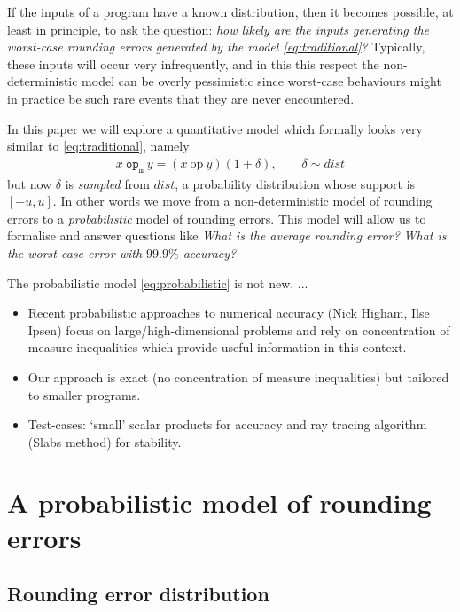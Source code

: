\documentclass[10pt,conference]{IEEEtran}
\newcommand{\mop}{\mathtt{op_m}}
\newcommand{\iop}{\mathrm{op}}
\begin{document}
If the inputs of a program have a known distribution, then it becomes possible, at least in principle, to ask the question: \textit{how likely are the inputs generating the worst-case rounding errors generated by the model \cref{eq:traditional}?} Typically, these inputs will occur very infrequently, and in this this respect the non-deterministic model can be overly pessimistic since worst-case behaviours might in practice be such rare events that they are never encountered. 

In this paper we will explore a quantitative model which formally looks very similar to \cref{eq:traditional}, namely
\begin{align}
x~\mop~y=(x~\iop~y)(1+\delta), \qquad\delta\sim dist \label{eq:probabilistic}
\end{align}
but now $\delta$ is \emph{sampled} from $dist$, a probability distribution whose support is $\left[-u,u\right]$. In other words we move from a non-deterministic model of rounding errors to a \emph{probabilistic} model of rounding errors. This model will allow us to formalise and answer questions like \textit{What is the average rounding error?} \textit{What is the worst-case error with $99.9\%$ accuracy?}

The probabilistic model \cref{eq:probabilistic} is not new. ...



\begin{itemize}
\item Recent probabilistic approaches to numerical accuracy (Nick Higham, Ilse Ipsen) focus on large/high-dimensional problems and rely on concentration of measure inequalities which provide useful information in this context.
\item Our approach is exact (no concentration of measure inequalities) but tailored to smaller programs. 
\item Test-cases: `small' scalar products for accuracy and ray tracing algorithm (Slabs method) for stability. 
\end{itemize} 

\section{A probabilistic model of rounding errors}

\subsection{Rounding error distribution}\label{subsec:error_dist}
\end{document}
